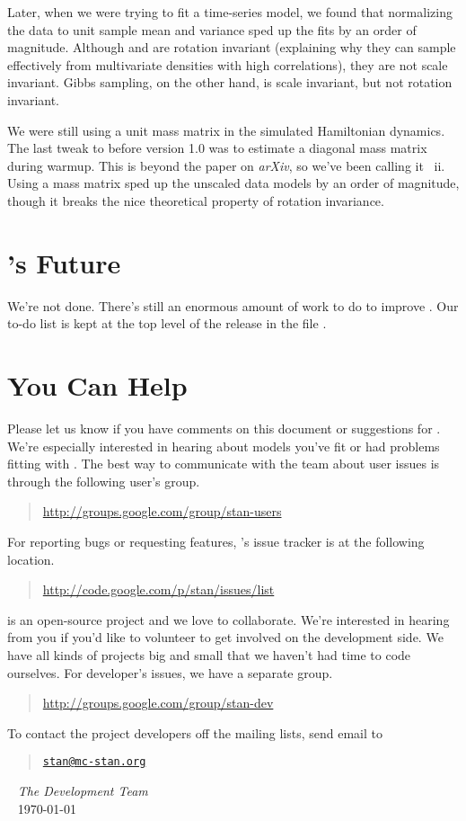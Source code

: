 Later, when we were trying to fit a time-series model, we found that
normalizing the data to unit sample mean and variance sped up the fits
by an order of magnitude.  Although \HMC and \NUTS are rotation
invariant (explaining why they can sample effectively from
multivariate densities with high correlations), they are not scale
invariant.  Gibbs sampling, on the other hand, is scale invariant, but
not rotation invariant.

We were still using a unit mass matrix in the simulated Hamiltonian
dynamics.  The last tweak to \Stan before version 1.0 was to estimate
a diagonal mass matrix during warmup.  This is beyond the \NUTS paper
on {\it arXiv}, so we've been calling it \NUTS~{\sc ii}.  Using a mass
matrix sped up the unscaled data models by an order of magnitude,
though it breaks the nice theoretical property of rotation invariance.

\section*{\Stan's Future}

We're not done. There's still an enormous amount of work to do to
improve \Stan.  Our to-do list is kept at the top level of the release
in the file .  

\section*{You Can Help}

Please let us know if you have comments on this document or
suggestions for \Stan.  We're especially interested in hearing about
models you've fit or had problems fitting with \Stan.  The best way to
communicate with the \Stan team about user issues is through the
following user's group.
%
\begin{quote}
\url{http://groups.google.com/group/stan-users}
\end{quote}
%
For reporting bugs or requesting features, \Stan's issue tracker is at
the following location.
%
\begin{quote}
\url{http://code.google.com/p/stan/issues/list}
\end{quote}

\Stan is an open-source project and we love to collaborate.  We're
interested in hearing from you if you'd like to volunteer to get
involved on the development side.  We have all kinds of projects big
and small that we haven't had time to code ourselves.  For developer's
issues, we have a separate group.
%
\begin{quote}
\url{http://groups.google.com/group/stan-dev}
\end{quote}

To contact the project developers off the mailing lists, send email to
\begin{quote}
\href{mailto:stan@mc-stan.org}{\nolinkurl{stan@mc-stan.org}}
\end{quote}

\vspace*{12pt}
\mbox{ } \hfill {\it The \Stan Development Team}
\\
\mbox{ } \hfill \today
